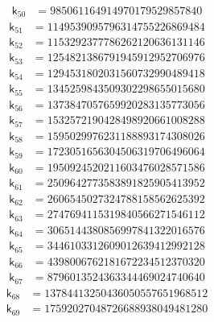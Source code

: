 \[
\begin{aligned}
\mathsf{k}_{50} &={} 985061164914970179529857840
\end{aligned}
\]
\[
\begin{aligned}
\mathsf{k}_{51} &={} 1149539095796314755226869484
\end{aligned}
\]
\[
\begin{aligned}
\mathsf{k}_{52} &={} 1153292377786262120636131146
\end{aligned}
\]
\[
\begin{aligned}
\mathsf{k}_{53} &={} 1254821386791945912952706976
\end{aligned}
\]
\[
\begin{aligned}
\mathsf{k}_{54} &={} 1294531802031560732990489418
\end{aligned}
\]
\[
\begin{aligned}
\mathsf{k}_{55} &={} 1345259843509302298655015680
\end{aligned}
\]
\[
\begin{aligned}
\mathsf{k}_{56} &={} 1373847057659920283135773056
\end{aligned}
\]
\[
\begin{aligned}
\mathsf{k}_{57} &={} 1532572190428498920661008288
\end{aligned}
\]
\[
\begin{aligned}
\mathsf{k}_{58} &={} 1595029976231188893174308026
\end{aligned}
\]
\[
\begin{aligned}
\mathsf{k}_{59} &={} 1723051656304506319706496064
\end{aligned}
\]
\[
\begin{aligned}
\mathsf{k}_{60} &={} 1950924520211603476028571586
\end{aligned}
\]
\[
\begin{aligned}
\mathsf{k}_{61} &={} 2509642773583891825905413952
\end{aligned}
\]
\[
\begin{aligned}
\mathsf{k}_{62} &={} 2606545027324788158562625392
\end{aligned}
\]
\[
\begin{aligned}
\mathsf{k}_{63} &={} 2747694115319840566271546112
\end{aligned}
\]
\[
\begin{aligned}
\mathsf{k}_{64} &={} 3065144380856997841322016576
\end{aligned}
\]
\[
\begin{aligned}
\mathsf{k}_{65} &={} 3446103312609012639412992128
\end{aligned}
\]
\[
\begin{aligned}
\mathsf{k}_{66} &={} 4398006762181672234512370320
\end{aligned}
\]
\[
\begin{aligned}
\mathsf{k}_{67} &={} 8796013524363344469024740640
\end{aligned}
\]
\[
\begin{aligned}
\mathsf{k}_{68} &={} 13784413250436050557651968512
\end{aligned}
\]
\[
\begin{aligned}
\mathsf{k}_{69} &={} 17592027048726688938049481280
\end{aligned}
\]
